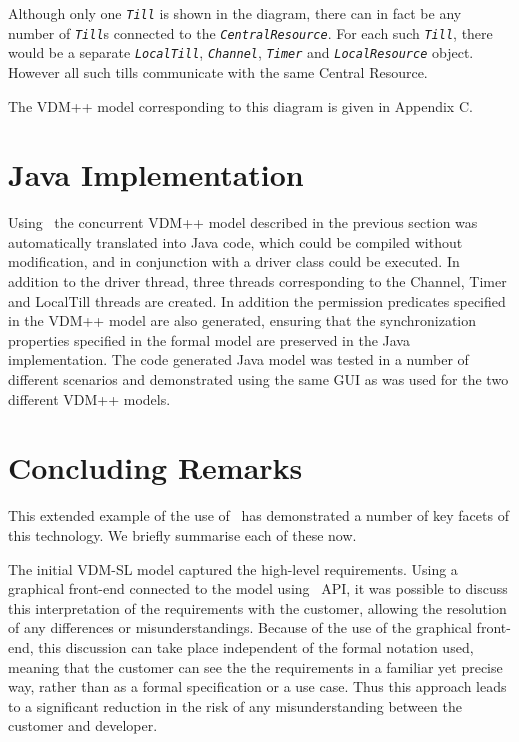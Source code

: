 \documentclass[\pformat,12pt,twoside]{article}
\begin{document}
Although only one \texttt{\emph{Till}} is shown in the diagram, there
can in fact be any number of \texttt{\emph{Till}}s connected to the
\texttt{\emph{CentralResource}}.  For each such \texttt{\emph{Till}},
there would be a separate \texttt{\emph{LocalTill}},
\texttt{\emph{Channel}}, \texttt{\emph{Timer}} and
\texttt{\emph{LocalResource}} object. However all such tills
communicate with the same Central Resource.

The VDM++ model corresponding to this diagram is given in Appendix 
C. 


\section{Java Implementation}\label{sec:javaimpl}

Using \vdmtools\ the concurrent VDM++ model described in the previous
section was automatically translated into Java code, which could be
compiled without modification, and in conjunction with a driver class
could be executed. In addition to the driver thread, three threads
corresponding to the Channel, Timer and LocalTill threads are
created. In addition the permission predicates specified in the VDM++
model are also generated, ensuring that the synchronization properties
specified in the formal model are preserved in the Java
implementation. The code generated Java model was tested in a number
of different scenarios and demonstrated using the same GUI as was used
for the two different VDM++ models.


\section{Concluding Remarks}\label{sec:conclude}

This extended example of the use of \vdmtools\ has demonstrated a
number of key facets of this technology. We briefly summarise each of
these now.  

The initial VDM-SL model captured the high-level requirements. Using a
graphical front-end connected to the model using \vdmtools\ API, it was
possible to discuss this interpretation of the requirements with the
customer, allowing the resolution of any differences or
misunderstandings. Because of the use of the graphical front-end, this
discussion can take place independent of the formal notation used,
meaning that the customer can see the the requirements in a familiar
yet precise way, rather than as a formal specification or a use
case. Thus this approach leads to a significant reduction in the risk
of any misunderstanding between the customer and developer.
\end{document}
